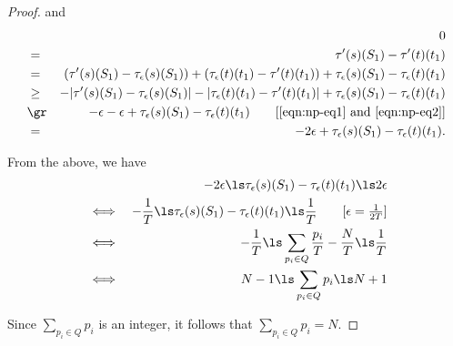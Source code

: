 \begin{proof}
	and 
	\begin{eqnarray*}
		&&0\\
		&=&	\tau'(s)(S_1) - \tau'(t)(t_1) \\
		&=&(\tau'(s)(S_1)-  \tauHyp(s)(S_1)) +(\tauHyp(t)(t_1) - \tau'(t)(t_1)) + \tauHyp(s)(S_1) - \tauHyp(t)(t_1) \\
		&\ge&-|\tau'(s)(S_1)- \tauHyp(s)(S_1)| -|\tauHyp(t)(t_1) - \tau'(t)(t_1)| +  \tauHyp(s)(S_1) - \tauHyp(t)(t_1) \\
		&\gr& -\epsilon - \epsilon + \tauHyp(s)(S_1) - \tauHyp(t)(t_1) \commenteq{\eqref{eqn:np-eq1} and \eqref{eqn:np-eq2}}\\
		&=&-2\epsilon +  \tauHyp(s)(S_1) - \tauHyp(t)(t_1) .
	\end{eqnarray*}
	
	From the above, we have 
	\begin{eqnarray*}
		&&-2\epsilon \ls\tauHyp(s)(S_1) - \tauHyp(t)(t_1) \ls 2\epsilon\\
		&\iff& -\frac{1}{T} \ls \tauHyp(s)(S_1) - \tauHyp(t)(t_1) \ls \frac{1}{T} \commenteq{$\epsilon = \frac{1}{2T}$}\\
		&\iff& -\frac{1}{T} \ls \sum_{p_i \in Q} \frac{p_i}{T} - \frac{N}{T} \ls \frac{1}{T}\\
		&\iff& N-1\ls \sum_{p_i \in Q} p_i \ls N+1
	\end{eqnarray*}
	
	Since $\sum_{p_i \in Q} p_i$ is an integer,  it follows that $\sum_{p_i \in Q} p_i = N$.
\end{proof}



\propositionApproximateGlobalRelationSubset*

